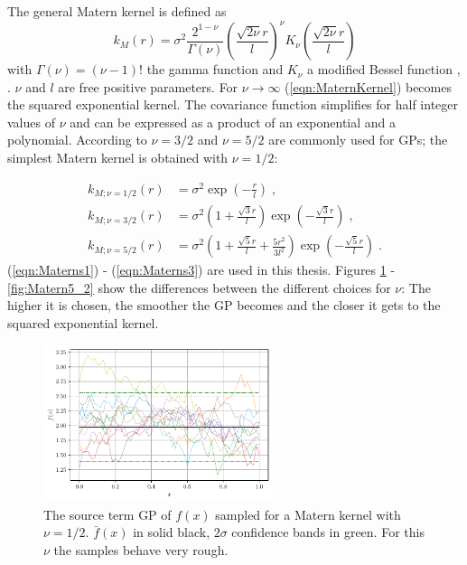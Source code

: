 \documentclass[%
  a4paper,oneside,%
  11pt,%
  smallchapters,
  style=printdev,
  extramargin,
  green,%
  rgb, <cmyk>
  ]{tubsbook}
\begin{document}
The general Matern kernel is defined as
\begin{equation}
k_M(r) = \sigma^2 \frac{2^{1-\nu}}{\Gamma(\nu)}  \left( \frac{\sqrt{2\nu}r}{l}  \right)^{\nu} K_{\nu}  \left(  \frac{\sqrt{2\nu}r}{l}   \right)
\label{eqn:MaternKernel}
\end{equation}
with $\Gamma(\nu) = (\nu - 1)!$ the gamma function and $K_{\nu}$ a modified Bessel function \cite[p.84 ff.]{abramowitz2013}, \cite{rasmussen2006}. $\nu$ and $l$ are free positive parameters.
For $\nu \to \infty$  (\ref{eqn:MaternKernel}) becomes the squared exponential kernel.
The covariance function simplifies for half integer values of $\nu$ and can be expressed as a product of an exponential and a polynomial. According to \cite{rasmussen2006} $\nu = 3/2$ and $\nu = 5/2$ are commonly used for GPs; the simplest Matern kernel is obtained with $\nu = 1/2$:

\begin{align}
k_{M;\nu = 1/2}(r) &=   \sigma^2 \exp(- \frac{r}{l})  \; , \\
\label{eqn:Materns1}
k_{M;\nu = 3/2}(r) &=  \sigma^2 \left(      1+ \frac{\sqrt{3}r}{l}  	\right)  \exp(- \frac{\sqrt{3} r}{l})  \; , \\
k_{M;\nu = 5/2}(r) &=  \sigma^2\left(      1+ \frac{\sqrt{5}r}{l}  + \frac{5r^2}{3l^2}	\right)  \exp(- \frac{\sqrt{5} r}{l}) \; .
\label{eqn:Materns3}
\end{align}
%
(\ref{eqn:Materns1}) - (\ref{eqn:Materns3}) are used in this thesis. Figures \ref{fig:Matern1_2} - \ref{fig:Matern5_2} show the differences between the different choices for $\nu$: The higher it is chosen, the smoother the GP becomes and the closer it gets to the squared exponential kernel.
\begin{figure}[!ht]
\begin{center}

\includegraphics[width=0.6\textwidth]{pics/matern1_2_f_sampled}
\caption{The source term GP of $f(x)$ sampled for a Matern kernel with $\nu=1/2$. $\bar{f}(x)$ in solid black, $2\sigma$ confidence bands in green. For this $\nu$ the samples behave very rough.}
\label{fig:Matern1_2}

\end{center}
\end{figure}
\end{document}
